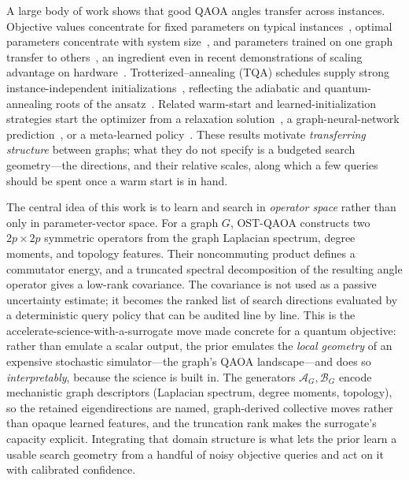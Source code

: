 \documentclass[aps,prxquantum,reprint,amsmath,amssymb,floatfix,nofootinbib,superscriptaddress,longbibliography]{revtex4-2}
\theoremstyle{remark}
\newcommand{\OSTQAOA}{\textnormal{\textsc{OST-QAOA}}}
\newcommand{\TQA}{\textnormal{\textsc{TQA}}}
\newcommand{\calA}{\mathcal{A}}
\newcommand{\calB}{\mathcal{B}}
\begin{document}
A large body of work shows that good QAOA angles transfer across instances.
Objective values concentrate for fixed parameters on typical
instances~\cite{brandao2018,zhou2020}, optimal parameters concentrate with system
size~\cite{akshay2021}, and parameters trained on one graph transfer to
others~\cite{galda2021,shaydulin2023transfer}, an ingredient even in recent
demonstrations of scaling advantage on hardware~\cite{shaydulin2024,harrigan2021,pagano2020}.
Trotterized--annealing (\TQA{})
schedules supply strong instance-independent initializations~\cite{sack2021},
reflecting the adiabatic and quantum-annealing roots of the
ansatz~\cite{farhi2001adiabatic,kadowaki1998}.  Related warm-start and
learned-initialization strategies start the optimizer from a relaxation
solution~\cite{egger2021warmstart}, a graph-neural-network
prediction~\cite{jain2022gnn}, or a meta-learned
policy~\cite{khairy2020}.
These results motivate \emph{transferring structure} between graphs; what they do
not specify is a budgeted search geometry---the directions, and their relative
scales, along which a few queries should be spent once a warm start is in hand.

The central idea of this work is to learn and search in \emph{operator space}
rather than only in parameter-vector space.  For a graph \(G\), \OSTQAOA{}
constructs two \(2p\times2p\) symmetric operators from the graph Laplacian
spectrum, degree moments, and topology features.  Their noncommuting product
defines a commutator energy, and a truncated spectral decomposition of the
resulting angle operator gives a low-rank covariance.  The covariance is not used
as a passive uncertainty estimate; it becomes the ranked list of search
directions evaluated by a deterministic query policy that can be audited line by
line.  This is the accelerate-science-with-a-surrogate move made concrete for a
quantum objective: rather than emulate a scalar output, the prior emulates the
\emph{local geometry} of an expensive stochastic simulator---the graph's QAOA
landscape---and does so \emph{interpretably}, because the science is built in.  The
generators \(\calA_G,\calB_G\) encode mechanistic graph descriptors (Laplacian
spectrum, degree moments, topology), so the retained eigendirections are named,
graph-derived collective moves rather than opaque learned features, and the
truncation rank makes the surrogate's capacity explicit.  Integrating that
domain structure is what lets the prior learn a usable search geometry from a
handful of noisy objective queries and act on it with calibrated confidence.
\end{document}
